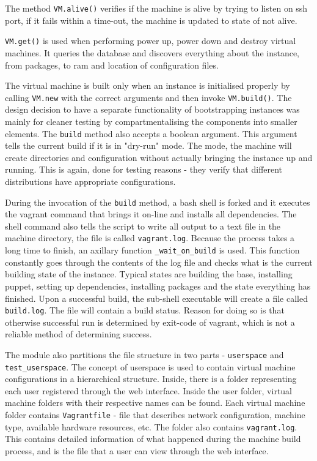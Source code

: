 \documentclass{article}
\begin{document}
The method \texttt{VM.alive()} verifies if the machine is alive by trying to listen on \gls{ssh} port, if it fails within a time-out, the machine is updated to state of not alive.	

\texttt{VM.get()} is used when performing power up, power down and destroy virtual machines. It queries the database and discovers everything about the instance, from packages, to \gls{ram} and location of configuration files.

The virtual machine is built only when an instance is initialised properly by calling \texttt{VM.new} with the correct arguments and then invoke \texttt{VM.build()}. The design decision to have a separate functionality of bootstrapping instances was mainly for cleaner testing by compartmentalising the components into smaller elements. The \texttt{build} method also accepts a boolean argument. This argument tells the current build if it is in "dry-run" mode. The mode, the machine will create directories and configuration without actually bringing the instance up and running. This is again, done for testing reasons - they verify that different \glspl{distribution} have appropriate configurations.

During the invocation of the \texttt{build} method, a \gls{bash} shell is forked and it executes the \gls{vagrant} command that brings it on-line and installs all dependencies. The shell command also tells the script to write all output to a text file in the machine directory, the file is called \texttt{vagrant.log}. Because the process takes a long time to finish, an axillary function \texttt{\_wait\_on\_build} is used. This function constantly goes through the contents of the log file and checks what is the current building state of the instance. Typical states are building the base, installing puppet, setting up dependencies, installing packages and the state everything has finished. 
Upon a successful build, the sub-shell executable will create a file called \texttt{build.log}. The file will contain a build status. Reason for doing so is that otherwise successful run is determined by exit-code of vagrant, which is not a reliable method of determining success.

The module also partitions the file structure in two parts - \texttt{userspace} and  \texttt{test\_userspace}. The concept of userspace is used to contain virtual machine configurations in a hierarchical structure. Inside, there is a folder representing each user registered through the web interface. Inside the user folder, virtual machine folders with their respective names can be found. Each virtual machine folder contains \texttt{Vagrantfile} - file that describes network configuration, machine type, available hardware resources, etc. The folder also contains \texttt{vagrant.log}. This contains detailed information of what happened during the machine build process, and is the file that a user can view through the web interface.
\end{document}
